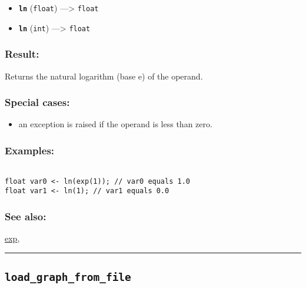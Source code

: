 \documentclass[]{book}
\providecommand{\tightlist}{%
  \setlength{\itemsep}{0pt}\setlength{\parskip}{0pt}}
\theoremstyle{definition}
\theoremstyle{definition}
\theoremstyle{definition}
\theoremstyle{remark}
\begin{document}
\begin{itemize}
\tightlist
\item
  \textbf{\texttt{ln}} (\texttt{float}) ---\textgreater{} \texttt{float}
\item
  \textbf{\texttt{ln}} (\texttt{int}) ---\textgreater{} \texttt{float}
\end{itemize}

\subsubsection{Result:}\label{result-315}

Returns the natural logarithm (base e) of the operand.

\subsubsection{Special cases:}\label{special-cases-90}

\begin{itemize}
\tightlist
\item
  an exception is raised if the operand is less than zero.
\end{itemize}

\subsubsection{Examples:}\label{examples-225}

\begin{verbatim}
 
float var0 <- ln(exp(1)); // var0 equals 1.0 
float var1 <- ln(1); // var1 equals 0.0
\end{verbatim}

\subsubsection{See also:}\label{see-also-128}

\href{OperatorsDH\#exp}{exp},

\begin{center}\rule{0.5\linewidth}{\linethickness}\end{center}

\subsection{\texorpdfstring{\texttt{load\_graph\_from\_file}}{load\_graph\_from\_file}}\label{load_graph_from_file}
\end{document}
